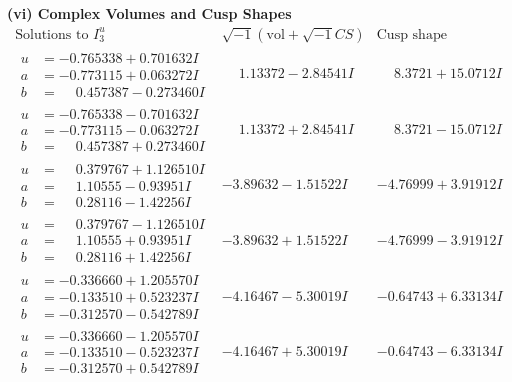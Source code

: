 \documentclass[1p]{elsarticle_modified}
\theoremstyle{definition}
\newcommand{\I}{\sqrt{-1}}
\begin{document}
\newpage\flushleft \textbf{(vi) Complex Volumes and Cusp Shapes}
$$\begin{array}{c|c|c}  
\text{Solutions to }I^u_{3}& \I (\text{vol} + \sqrt{-1}CS) & \text{Cusp shape}\\
 \hline 
\begin{aligned}
u &= -0.765338 + 0.701632 I \\
a &= -0.773115 + 0.063272 I \\
b &= \phantom{-}0.457387 - 0.273460 I\end{aligned}
 & \phantom{-}1.13372 - 2.84541 I & \phantom{-}8.3721 + 15.0712 I \\ \hline\begin{aligned}
u &= -0.765338 - 0.701632 I \\
a &= -0.773115 - 0.063272 I \\
b &= \phantom{-}0.457387 + 0.273460 I\end{aligned}
 & \phantom{-}1.13372 + 2.84541 I & \phantom{-}8.3721 - 15.0712 I \\ \hline\begin{aligned}
u &= \phantom{-}0.379767 + 1.126510 I \\
a &= \phantom{-}1.10555 - 0.93951 I \\
b &= \phantom{-}0.28116 - 1.42256 I\end{aligned}
 & -3.89632 - 1.51522 I & -4.76999 + 3.91912 I \\ \hline\begin{aligned}
u &= \phantom{-}0.379767 - 1.126510 I \\
a &= \phantom{-}1.10555 + 0.93951 I \\
b &= \phantom{-}0.28116 + 1.42256 I\end{aligned}
 & -3.89632 + 1.51522 I & -4.76999 - 3.91912 I \\ \hline\begin{aligned}
u &= -0.336660 + 1.205570 I \\
a &= -0.133510 + 0.523237 I \\
b &= -0.312570 - 0.542789 I\end{aligned}
 & -4.16467 - 5.30019 I & -0.64743 + 6.33134 I \\ \hline\begin{aligned}
u &= -0.336660 - 1.205570 I \\
a &= -0.133510 - 0.523237 I \\
b &= -0.312570 + 0.542789 I\end{aligned}
 & -4.16467 + 5.30019 I & -0.64743 - 6.33134 I \\ \hline\begin{aligned}

\end{aligned}
\end{array}$$
\end{document}
